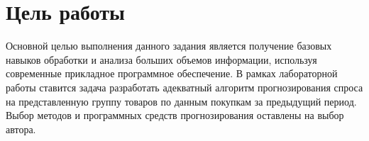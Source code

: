 \section{Цель работы}

Основной целью выполнения данного задания является получение базовых навыков обработки и анализа больших объемов информации, используя современные прикладное программное обеспечение.
В рамках лабораторной работы ставится задача разработать адекватный алгоритм прогнозирования спроса на представленную группу товаров по данным покупкам за предыдущий период. Выбор методов и программных средств прогнозирования оставлены на выбор автора.